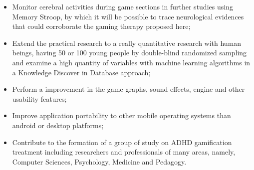 \begin{itemize}
	\item Monitor cerebral activities during game sections in further studies using Memory Stroop, by which it will be possible to trace neurological evidences that could corroborate the gaming therapy proposed here;
	\item Extend the practical research to a really quantitative research with human beings, having 50 or 100 young people by double-blind randomized sampling and examine a high quantity of variables with machine learning algorithms in a Knowledge Discover in Database approach;
	\item Perform a improvement in the game graphs, sound effects, engine and other usability features;
	\item Improve application portability to other mobile operating systems than android or desktop platforms;
	\item Contribute to the formation of a group of study on ADHD gamification treatment including researchers and professionals of many areas, namely, Computer Sciences, Psychology, Medicine and Pedagogy.
	
	
\end{itemize}